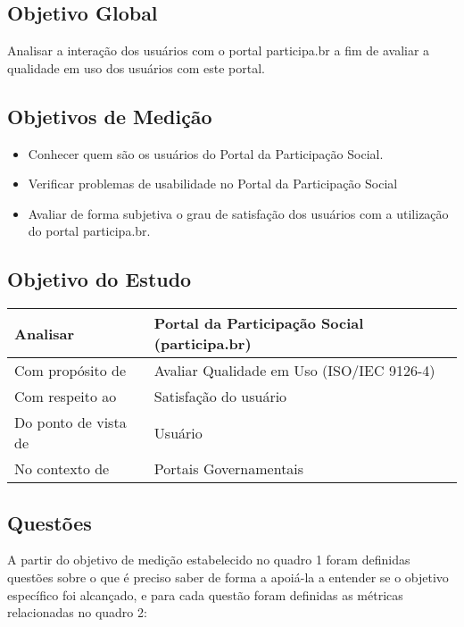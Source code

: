 \subsection{Objetivo Global}

	Analisar a interação dos usuários com o portal participa.br a fim de avaliar a qualidade em uso dos usuários com este portal. 

\subsection{Objetivos de Medição}

\begin{itemize}
\item Conhecer quem são os usuários do Portal da Participação Social.
\item Verificar problemas de usabilidade no Portal da Participação Social
\item Avaliar de forma subjetiva o grau de satisfação dos usuários com a utilização do portal participa.br. 
\end{itemize}


\subsection{Objetivo do Estudo}


\begin{table}[h]
\begin{tabular}{|l|l|}
\hline
Analisar             & Portal da Participação Social (participa.br) \\ \hline
Com propósito de     & Avaliar Qualidade em Uso (ISO/IEC 9126-4)    \\ \hline
Com respeito ao      & Satisfação do usuário                        \\ \hline
Do ponto de vista de & Usuário                                      \\ \hline
No contexto de       & Portais Governamentais                       \\ \hline
\end{tabular}
\end{table}

\subsection{Questões}

A partir do objetivo de medição estabelecido no quadro 1  foram definidas questões sobre o que é preciso saber de forma a apoiá-la a entender se o objetivo específico foi alcançado, e para cada questão foram definidas as métricas relacionadas no quadro 2: 


